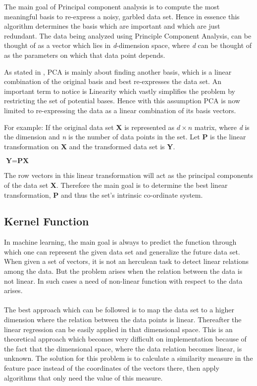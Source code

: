 The main goal of Principal component analysis is to compute the most meaningful basis to re-express a noisy, garbled data set. Hence in essence this algorithm determines the basis which are important and which are just redundant. The data being analyzed using Principle Component Analysis, can be thought of as a vector which lies in \textit{d}-dimension space, where \textit{d} can be thought of as the parameters on which that data point depends. 

As stated in \cite{shlens2014tutorial}, PCA is mainly about finding another basis, which is a linear combination of the original basis and best re-expresses the data set. An important term to notice is Linearity which vastly simplifies the problem by restricting the set of potential bases. Hence with this assumption PCA is now limited to re-expressing the data as a linear combination of its basis vectors. 

For example: If the original data set \textbf{X} is represented as \textit{$d\times n$} matrix, where \textit{d} is the dimension and \textit{n} is the number of data points in the set. Let \textbf{P} is the linear transformation on \textbf{X} and the transformed data set is \textbf{Y}.\\

\begin{center}$\textbf{Y} = \textbf{P}\textbf{X}$\end{center}

The row vectors in this linear transformation will act as the principal components of  the data set \textbf{X}. Therefore the main goal is to determine the best linear transformation, \textbf{P} and thus the set's intrinsic co-ordinate system. 









\subsection{Kernel Function }

In machine learning, the main goal is always to predict the function through which one can represent the given data set and generalize the future data set. When given a set of vectors, it is not an herculean task to detect linear relations among the data. But the problem arises when the relation between the data is not linear. In such cases a need of non-linear function with respect to the data arises. \\\\
The best approach which can be followed is to map the data set to a higher dimension where the relation between the data points is linear. Thereafter the linear regression can be easily applied in that dimensional space. This is an theoretical approach which becomes very difficult on implementation because of the fact that the dimensional space, where the data relation becomes linear, is unknown. The solution for this problem is to calculate a similarity measure in the feature pace instead of the coordinates of the vectors there, then apply algorithms that only need the value of this measure.

